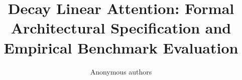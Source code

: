 \title{\textbf{Decay Linear Attention: Formal Architectural Specification and Empirical Benchmark Evaluation}}

\author{Anonymous authors}
